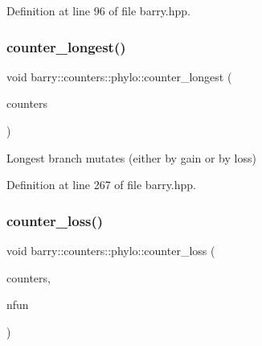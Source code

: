 Definition at line 96 of file barry.\+hpp.

\mbox{\label{namespacebarry_1_1counters_1_1phylo_a0961e61bafbce356cb78de10b0aa9950}} 
\subsubsection{\texorpdfstring{counter\+\_\+longest()}{counter\_longest()}}
{\footnotesize\ttfamily void barry\+::counters\+::phylo\+::counter\+\_\+longest (\begin{DoxyParamCaption}\item[{\hyperlink{namespacebarry_1_1counters_1_1phylo_a2f117d1cd1dff67e1539cbc0aef5766a}{Phylo\+Counter\+Vector} $\ast$}]{counters }\end{DoxyParamCaption})\hspace{0.3cm}{\ttfamily [inline]}}



Longest branch mutates (either by gain or by loss) 



Definition at line 267 of file barry.\+hpp.

\mbox{\label{namespacebarry_1_1counters_1_1phylo_a3696a504003f84eadd48865dd8d51559}} 
\subsubsection{\texorpdfstring{counter\+\_\+loss()}{counter\_loss()}}
{\footnotesize\ttfamily void barry\+::counters\+::phylo\+::counter\+\_\+loss (\begin{DoxyParamCaption}\item[{\hyperlink{namespacebarry_1_1counters_1_1phylo_a2f117d1cd1dff67e1539cbc0aef5766a}{Phylo\+Counter\+Vector} $\ast$}]{counters,  }\item[{std\+::vector$<$ \hyperlink{namespacebarry_a11dfc53ddb4672278319aa04f1e09a6c}{uint} $>$}]{nfun }\end{DoxyParamCaption})\hspace{0.3cm}{\ttfamily [inline]}}



